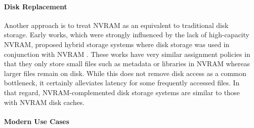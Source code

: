 \paragraph{Disk Replacement}

Another approach is to treat \ac{NVRAM} as an equivalent to traditional disk
storage. Early works, which were strongly influenced by the lack of
high-capacity \ac{NVRAM}, proposed hybrid storage systems where disk storage was
used in conjunction with \ac{NVRAM} \cite{wang2002conquest, miller2001hermes}.
These works have very similar assignment policies in that they only store small
files such as metadata or libraries in \ac{NVRAM} whereas larger files remain on
disk. While this does not remove disk access as a common bottleneck, it
certainly alleviates latency for some frequently accessed files. In that regard,
\ac{NVRAM}-complemented disk storage systems are similar to those with
\ac{NVRAM} disk caches.

\paragraph{Modern Use Cases}

